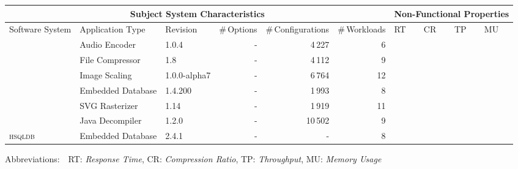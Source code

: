 \begin{tabularx}{\textwidth}{lllrrr|XXXX}
		\toprule
		\multicolumn{6}{c}{\textbf{Subject System Characteristics}} & \multicolumn{4}{c}{\textbf{Non-Functional Properties}} \\
		\midrule
		Software System &  Application Type & Revision & \#\,Options & \#\,Configurations & \#\,Workloads & RT & CR & TP & MU \\
		\midrule
		\jumper & Audio Encoder & 1.0.4 & - & 4\,227 & 6 & \xmark & \xmark &  & \xmark  \\
		
		\kanzi & File Compressor & 1.8 & - & 4\,112 & 9 & \xmark & \xmark &  & \xmark  \\
			
		\dconvert & Image Scaling & 1.0.0-alpha7 & - & 6\,764 & 12 & \xmark  &  &  & \xmark  \\
				
		\htwo & Embedded Database & 1.4.200 & - & 1\,993  & 8 &   &  & \xmark &  \\
		
		\batik & SVG Rasterizer & 1.14 & - & 1\,919 &  11 & \xmark &   &  & \xmark  \\
		
		\jadx & Java Decompiler & 1.2.0 & - & 10\,502 & 9 & \xmark &  &  & \xmark  \\
			
		\textsc{hsqldb} & Embedded Database & 2.4.1 & - & - & 8  &  &  & \xmark &  \\
		

		
		
		
		
		\bottomrule
	\end{tabularx}
	
	{\vspace{2mm}
	{\footnotesize Abbreviations:$\quad$RT: \textit{Response Time}, CR: \textit{Compression Ratio}, TP: \textit{Throughput}, MU: \textit{Memory Usage}}}
	\vspace{0.1cm}

